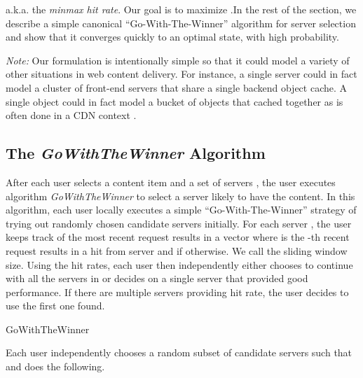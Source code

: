 \documentclass[conference]{IEEEtran}
\newcommand{\comment}[1]{}
\begin{document}
a.k.a. the \textsl{minmax hit rate}.  Our goal is to maximize .In the rest of the section, we describe a simple canonical  ``Go-With-The-Winner''  algorithm for server selection and show that it converges quickly to an optimal state, with high probability.

{\em Note:} Our formulation is intentionally simple so that it could model a variety of other situations in web content delivery. For instance, a single server could in fact model a cluster of front-end servers that share a single backend object cache. A single object could in fact model a bucket of objects that cached together as is often done in a CDN context \cite{nygren2010akamai}. 

\subsection{The \textsl{GoWithTheWinner} Algorithm}
\comment{After each user  has picked an content item using the power law distribution described in Equation~\ref{eq:powerlaw},  algorithm \textsl{GoWithTheWinner} described below is executed independently by each user  to select a server that's likely to have the content. In this algorithm, each user locally executes a simple ``Go-With-The-Winner'' strategy of trying out  randomly chosen candidate servers initially.  Then, using the past hit rate over a time window of length  as feedback, each user independently either chooses to continue with all the servers in  or decides on a  single server that provided the best performance.  If multiple servers provided a  hit rate in line 8 of the algorithm, the user decides to use the first one found.} 

After each user  selects a content item and a set of  servers ,  the user executes algorithm \textsl{GoWithTheWinner} to select a server likely to have the content. In this algorithm, each user locally executes a simple ``Go-With-The-Winner'' strategy of trying out  randomly chosen candidate servers initially. For each server , the user keeps track of the most recent request results in a vector  where  is the -th recent request results in a hit from server  and  if otherwise. We call  the sliding window size. Using the hit rates, each user then independently either chooses to continue with all the servers in  or decides on a  single server that provided good performance. If there are multiple servers providing  hit rate, the user decides to use the first one found.



  \LinesNumbered
  \PrintSemicolon
  \SetAlgoLined
  \begin{algorithm}[t]
    \caption{GoWithTheWinner}
Each user  independently chooses a random subset  of candidate servers such that  and does the following.\\
  \end{algorithm}
\end{document}
